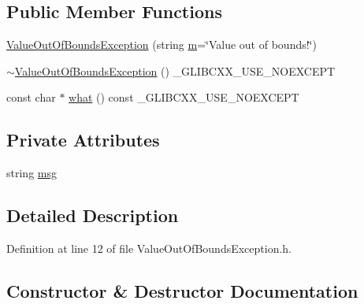 \subsection*{Public Member Functions}
\begin{DoxyCompactItemize}
\item 
\hyperlink{class_hardware_1_1_exception_1_1_value_out_of_bounds_exception_a1756ccdc56400b77e1f085df854738e4}{Value\+Out\+Of\+Bounds\+Exception} (string \hyperlink{_gen_blob_8m_ab3cd915d758008bd19d0f2428fbb354a}{m}=\char`\"{}Value out of bounds!\char`\"{})
\item 
\hyperlink{class_hardware_1_1_exception_1_1_value_out_of_bounds_exception_ac94abda1653cca6c85a936e46e0d0424}{$\sim$\+Value\+Out\+Of\+Bounds\+Exception} () \+\_\+\+G\+L\+I\+B\+C\+X\+X\+\_\+\+U\+S\+E\+\_\+\+N\+O\+E\+X\+C\+E\+P\+T
\item 
const char $\ast$ \hyperlink{class_hardware_1_1_exception_1_1_value_out_of_bounds_exception_a2c3892baec3ab92f686b31c5f15b59b2}{what} () const \+\_\+\+G\+L\+I\+B\+C\+X\+X\+\_\+\+U\+S\+E\+\_\+\+N\+O\+E\+X\+C\+E\+P\+T
\end{DoxyCompactItemize}
\subsection*{Private Attributes}
\begin{DoxyCompactItemize}
\item 
string \hyperlink{class_hardware_1_1_exception_1_1_value_out_of_bounds_exception_a9a118d00116fbc47c0eaa7e502a8ea68}{msg}
\end{DoxyCompactItemize}


\subsection{Detailed Description}


Definition at line 12 of file Value\+Out\+Of\+Bounds\+Exception.\+h.



\subsection{Constructor \& Destructor Documentation}
\hypertarget{class_hardware_1_1_exception_1_1_value_out_of_bounds_exception_a1756ccdc56400b77e1f085df854738e4}{}
